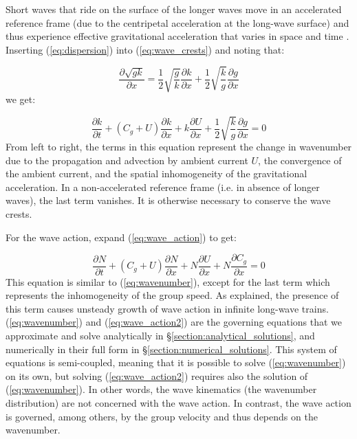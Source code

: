 \documentclass[lineno]{jfm}
\begin{document}
Short waves that ride on the surface of the longer waves move in an accelerated
reference frame (due to the centripetal acceleration at the long-wave surface)
and thus experience effective gravitational acceleration that varies in space
and time \citep{phillips1981dispersion,longuet1986eulerian,longuet1987propagation}.
Inserting (\ref{eq:dispersion}) into (\ref{eq:wave_crests}) and noting that:

\begin{equation}
\label{eq:dispersion_derivative}
\dfrac{\partial \sqrt{gk}}{\partial x} =
\dfrac{1}{2} \sqrt{\dfrac{g}{k}} \dfrac{\partial k}{\partial x} + \dfrac{1}{2} \sqrt{\dfrac{k}{g}} \dfrac{\partial g}{\partial x}
\end{equation}
we get:

\begin{equation}
\label{eq:wavenumber}
\dfrac{\partial k}{\partial t}
+ \left(C_g + U\right) \dfrac{\partial k}{\partial x}
+ k \dfrac{\partial U}{\partial x}
+ \dfrac{1}{2} \sqrt{\dfrac{k}{g}} \dfrac{\partial g}{\partial x}
= 0
\end{equation}
From left to right, the terms in this equation represent the change in wavenumber
due to the propagation and advection by ambient current $U$, the convergence of
the ambient current, and the spatial inhomogeneity of the gravitational acceleration.
In a non-accelerated reference frame (i.e. in absence of longer waves), the last
term vanishes.
It is otherwise necessary to conserve the wave crests.

For the wave action, expand (\ref{eq:wave_action}) to get:

\begin{equation}
\label{eq:wave_action2}
\dfrac{\partial N}{\partial t}
+ \left(C_g + U\right) \dfrac{\partial N}{\partial x}
+ N \dfrac{\partial U}{\partial x}
+ N \dfrac{\partial C_g}{\partial x}
= 0
\end{equation}
This equation is similar to (\ref{eq:wavenumber}), except for the last term
which represents the inhomogeneity of the group speed.
As \citet{peureux2021unsteady} explained, the presence of this term causes
unsteady growth of wave action in infinite long-wave trains.
(\ref{eq:wavenumber}) and (\ref{eq:wave_action2}) are the governing equations
that we approximate and solve analytically in \S\ref{section:analytical_solutions},
and numerically in their full form in \S\ref{section:numerical_solutions}.
This system of equations is semi-coupled, meaning that
it is possible to solve (\ref{eq:wavenumber}) on its own, but solving
(\ref{eq:wave_action2}) requires also the solution of (\ref{eq:wavenumber}).
In other words, the wave kinematics (the wavenumber distribution) are not
concerned with the wave action.
In contrast, the wave action is governed, among others, by the
group velocity and thus depends on the wavenumber.
\end{document}
